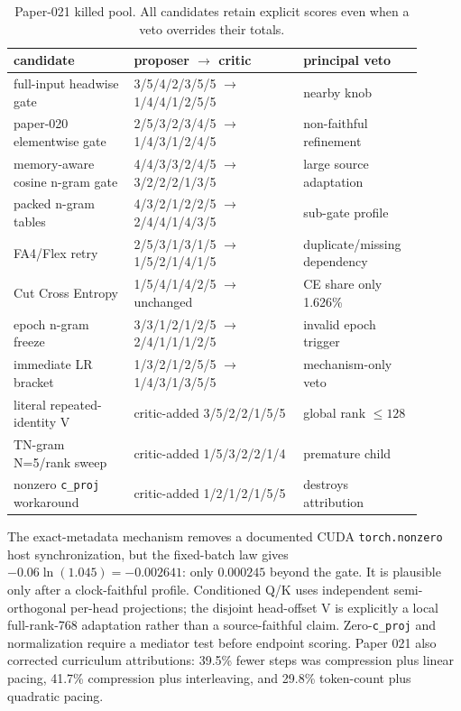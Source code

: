 \documentclass{article}
\begin{document}
\begin{table}[t]
\caption{Paper-021 killed pool.  All candidates retain explicit scores even
when a veto overrides their totals.}
\label{tab:p021kill}
\centering\scriptsize
\begin{tabular}{p{0.27\linewidth}p{0.38\linewidth}p{0.25\linewidth}}
\toprule
candidate & proposer $\rightarrow$ critic & principal veto\\
\midrule
full-input headwise gate & 3/5/4/2/3/5/5 $\rightarrow$ 1/4/4/1/2/5/5 & nearby knob\\
paper-020 elementwise gate & 2/5/3/2/3/4/5 $\rightarrow$ 1/4/3/1/2/4/5 & non-faithful refinement\\
memory-aware cosine n-gram gate & 4/4/3/3/2/4/5 $\rightarrow$ 3/2/2/2/1/3/5 & large source adaptation\\
packed n-gram tables & 4/3/2/1/2/2/5 $\rightarrow$ 2/4/4/1/4/3/5 & sub-gate profile\\
FA4/Flex retry & 2/5/3/1/3/1/5 $\rightarrow$ 1/5/2/1/4/1/5 & duplicate/missing dependency\\
Cut Cross Entropy & 1/5/4/1/4/2/5 $\rightarrow$ unchanged & CE share only 1.626\%\\
epoch n-gram freeze & 3/3/1/2/1/2/5 $\rightarrow$ 2/4/1/1/1/2/5 & invalid epoch trigger\\
immediate LR bracket & 1/3/2/1/2/5/5 $\rightarrow$ 1/4/3/1/3/5/5 & mechanism-only veto\\
literal repeated-identity V & critic-added 3/5/2/2/1/5/5 & global rank $\leq128$\\
TN-gram N=5/rank sweep & critic-added 1/5/3/2/2/1/4 & premature child\\
nonzero \texttt{c\_proj} workaround & critic-added 1/2/1/2/1/5/5 & destroys attribution\\
\bottomrule
\end{tabular}
\end{table}

The exact-metadata mechanism removes a documented CUDA
\texttt{torch.nonzero} host synchronization, but the fixed-batch law gives
$-0.06\ln(1.045)=-0.002641$: only $0.000245$ beyond the gate.  It is plausible
only after a clock-faithful profile.  Conditioned Q/K uses independent
semi-orthogonal per-head projections; the disjoint head-offset V is explicitly
a local full-rank-768 adaptation rather than a source-faithful claim.
Zero-\texttt{c\_proj} and normalization require a mediator test before
endpoint scoring.  Paper 021 also corrected curriculum attributions:
39.5\% fewer steps was compression plus linear pacing, 41.7\% compression
plus interleaving, and 29.8\% token-count plus quadratic pacing.
\end{document}
